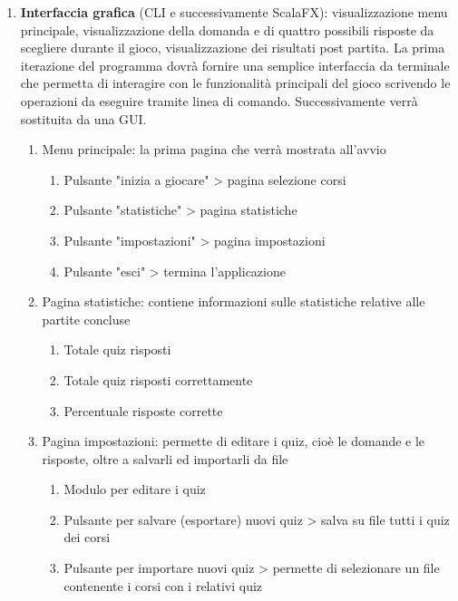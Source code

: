 \begin{enumerate}
            \item \textbf{Interfaccia grafica} (CLI e successivamente ScalaFX): visualizzazione menu principale, visualizzazione della domanda e di quattro possibili risposte da scegliere durante il gioco, visualizzazione dei risultati post partita. La prima iterazione del programma dovrà fornire una semplice interfaccia da terminale che permetta di interagire con le funzionalità principali del gioco scrivendo le operazioni da eseguire tramite linea di comando. Successivamente verrà sostituita da una GUI.
                \begin{enumerate}
                    \item Menu principale: la prima pagina che verrà mostrata all'avvio
                        \begin{enumerate}
                            \item Pulsante "inizia a giocare" > pagina selezione corsi
                            \item Pulsante "statistiche" > pagina statistiche
                            \item Pulsante "impostazioni" > pagina impostazioni
                            \item Pulsante "esci" > termina l'applicazione
                        \end{enumerate}
                    \item Pagina statistiche: contiene informazioni sulle statistiche relative alle partite concluse
                        \begin{enumerate}
                            \item Totale quiz risposti
                            \item Totale quiz risposti correttamente
                            \item Percentuale risposte corrette
                        \end{enumerate}
                    \item Pagina impostazioni: permette di editare i quiz, cioè le domande e le risposte, oltre a salvarli ed importarli da file
                        \begin{enumerate}
                            \item Modulo per editare i quiz
                            \item Pulsante per salvare (esportare) nuovi quiz > salva su file tutti i quiz dei corsi
                            \item Pulsante per importare nuovi quiz > permette di selezionare un file contenente i corsi con i relativi quiz

\end{enumerate}
\end{enumerate}
\end{enumerate}
